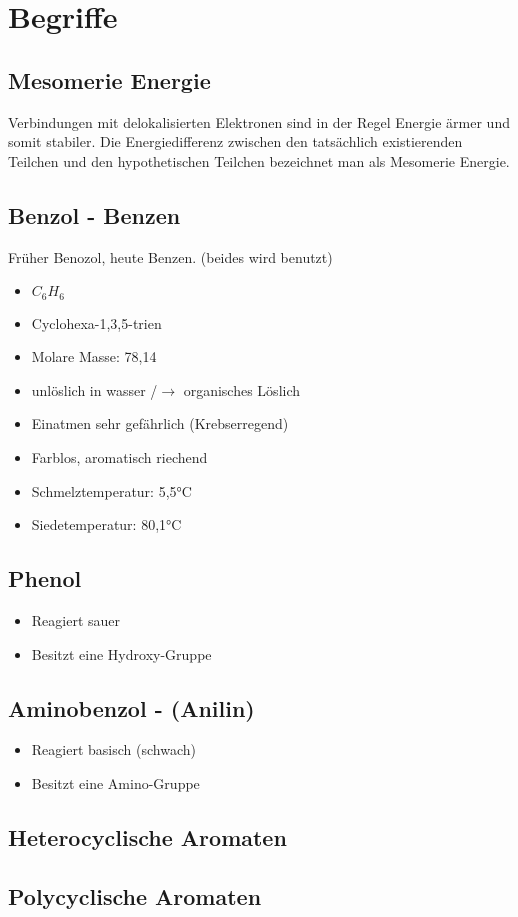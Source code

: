 \section{Begriffe}
\subsection{Mesomerie Energie}
Verbindungen mit delokalisierten Elektronen sind in der 
Regel Energie ärmer und somit stabiler. 
Die Energiedifferenz zwischen den tatsächlich existierenden 
Teilchen und den hypothetischen Teilchen bezeichnet man als 
Mesomerie Energie.

\subsection{Benzol - Benzen}
Früher Benozol, heute Benzen. (beides wird benutzt)
\begin{multicols}{2}
\begin{itemize}
    \item $C_6H_6$
    \item Cyclohexa-1,3,5-trien
    \item Molare Masse: 78,14
    \item unlöslich in wasser /$\rightarrow$ organisches Löslich
    \item Einatmen sehr gefährlich (Krebserregend)
    \item Farblos, aromatisch riechend
    \item Schmelztemperatur: 5,5°C
    \item Siedetemperatur: 80,1°C
\end{itemize}
\end{multicols}

\subsection{Phenol}
\begin{itemize}
    \item Reagiert sauer
    \item Besitzt eine Hydroxy-Gruppe
\end{itemize}

\subsection{Aminobenzol - (Anilin)}
\begin{itemize}
    \item Reagiert basisch (schwach)
    \item Besitzt eine Amino-Gruppe
\end{itemize}

\subsection{Heterocyclische Aromaten}

\subsection{Polycyclische Aromaten}
